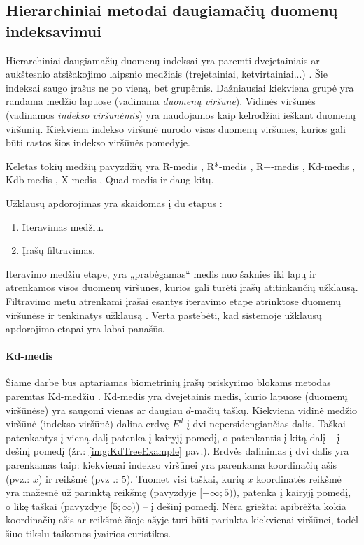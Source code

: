 \subsection{Hierarchiniai metodai daugiamačių duomenų indeksavimui}
\label{sec:HierarchicalIndices}

Hierarchiniai daugiamačių duomenų indeksai yra paremti dvejetainiais ar aukštesnio atsišakojimo laipsnio medžiais (trejetainiai, ketvirtainiai...) \cite{gaede1998multidimensional}.
Šie indeksai saugo įrašus ne po vieną, bet grupėmis.
Dažniausiai kiekviena grupė yra randama medžio lapuose (vadinama {\it duomenų viršūne}).
Vidinės viršūnės (vadinamos {\it indekso viršūnėmis}) yra naudojamos kaip kelrodžiai ieškant duomenų viršūnių.
Kiekviena indekso viršūnė nurodo visas duomenų viršūnes, kurios gali būti rastos šios indekso viršūnės pomedyje.

Keletas tokių medžių pavyzdžių yra R-medis \cite{guttman1984r}, R*-medis \cite{beckmann1990r}, R+-medis \cite{sellis1987r+}, Kd-medis \cite{bentley1979multidimensional}, Kdb-medis \cite{robinson1981kdb}, X-medis \cite{berchtold1996x}, Quad-medis \cite{habenicht1983quad} ir daug kitų.

Užklausų apdorojimas yra skaidomas į du etapus \cite{bohm2001searching}:
\begin{enumerate}
	\item Iteravimas medžiu.
	\item Įrašų filtravimas.
\end{enumerate}
Iteravimo medžiu etape, yra „prabėgamas“ medis nuo šaknies iki lapų ir atrenkamos visos duomenų viršūnės, kurios gali turėti įrašų atitinkančių užklausą.
Filtravimo metu atrenkami įrašai esantys iteravimo etape atrinktose duomenų viršūnėse ir tenkinatys užklausą \cite{brinkhoff1994multi} \cite{bohm2001searching}.
Verta pastebėti, kad sistemoje \cite{NeurotechnologyMegamatcherAccelerator} užklausų apdorojimo etapai yra labai panašūs.

\paragraph{Kd-medis}
\label{sec:Kd-tree}

Šiame darbe bus aptariamas biometrinių įrašų priskyrimo blokams metodas paremtas Kd-medžiu \cite{bentley1979multidimensional}.
Kd-medis yra dvejetainis medis, kurio lapuose (duomenų viršūnėse) yra saugomi vienas ar daugiau $d$-mačių taškų.
Kiekviena vidinė medžio viršūnė (indekso viršūnė) dalina erdvę $E^d$ į dvi nepersidengiančias dalis.
Taškai patenkantys į vieną dalį patenka į kairyjį pomedį, o patenkantis į kitą dalį -- į dešinį pomedį (žr.: \ref{img:KdTreeExample} pav.).
Erdvės dalinimas į dvi dalis yra parenkamas taip: kiekvienai indekso viršūnei yra parenkama koordinačių ašis (pvz.: $x$) ir reikšmė (pvz .: $5$).
Tuomet visi taškai, kurių $x$ koordinatės reikšmė yra mažesnė už parinktą reikšmę (pavyzdyje $[-\infty; 5)$), patenka į kairyjį pomedį, o likę taškai (pavyzdyje $[5; \infty)$) -- į dešinį pomedį.
Nėra griežtai apibrėžta kokia koordinačių ašis ar reikšmė šioje ašyje turi būti parinkta kiekvienai viršūnei, todėl šiuo tikslu taikomos įvairios euristikos.

